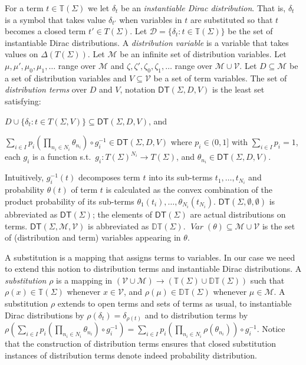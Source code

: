 \documentclass[submission,copyright,creativecommons]{eptcs}
\newcommand{\openT}{\mathbb{T}}
\newcommand{\openTerms}{\openT(\Sigma)}
\newcommand{\closedTerms}{T(\Sigma)}
\newcommand{\openDT}{\mathbb{DT}}
\newcommand{\openDTerms}{\openDT(\Sigma)}
\newcommand{\closedDTerms}{\DT(\Sigma)}
\newcommand{\Var}{\mathop{\textit{Var}}}
\newcommand{\TVar}{\mathcal{V}}
\newcommand{\PVar}{\mathcal{M}}
\newcommand{\DVar}{\mathcal{D}}
\newcommand{\DT}{\textsf{DT}}
\begin{document}
For a term $t\in\openTerms$ we let $\delta_t$ be an
\emph{instantiable Dirac distribution}. That is, $\delta_t$ is a
symbol that takes value $\delta_{t'}$ when variables in $t$
are substituted so that $t$ becomes a closed term $t'\in\closedTerms$.
Let $\DVar = \{\delta_t : t\in \openTerms\}$ be the set of
instantiable Dirac distributions.
A \emph{distribution variable} is a variable that takes values on
$\Delta(\closedTerms)$.  Let $\PVar$ be an infinite set of distribution
variables. Let $\mu, \mu', \mu_0, \mu_1, \ldots$ range over $\PVar$
and $\zeta, \zeta', \zeta_0, \zeta_1, \ldots$ range over $\PVar \cup \TVar$.
Let $D \subseteq \PVar$ be a set of distribution variables and $V\subseteq\TVar$ be a set of term variables.  
The set of \emph{distribution terms} over $D$ and $V$, notation $\DT(\Sigma, D, V)$ is the least set satisfying: 
\begin{inparaenum}[(i)]
\item $D \cup \{\delta_t : t\in T(\Sigma,V)\} \subseteq \DT(\Sigma, D,V)$, and
\item ${\textstyle \sum_{i\in I} p_i (\prod_{n_i \in N_i} \theta_{n_i}) \circ g_i^{-1}} 
  \in \DT(\Sigma, D, V)$ where
    $p_i \in (0,1]$ with $\sum_{i\in I} p_i = 1$,
each $g_i$ is a
function s.t.\ $g_i : \closedTerms^{N_i} \rightarrow \closedTerms$,
  and
$\theta_{n_i}\in \DT(\Sigma, D, V)$.
\end{inparaenum}
Intuitively, $g_i^{-1}(t)$ decomposes term $t$ into its sub-terms $t_1,\ldots,t_{N_i}$ and probability $\theta(t)$ of term $t$ is calculated as the convex combination of the product probability of its sub-terms $\theta_1(t_i),\ldots,\theta_{N_i}(t_{N_i})$.
$\DT(\Sigma, \emptyset, \emptyset)$ is abbreviated as $\closedDTerms$; the elements
of $\closedDTerms$ are actual distributions on terms. $\DT(\Sigma, \PVar, \TVar)$ is
abbreviated as $\openDTerms$.
$\Var(\theta) \subseteq \PVar \cup \TVar$ is the set of  
(distribution and term) variables appearing in $\theta$.


A substitution is a mapping that assigns terms to variables.  In our
case we need to extend this notion to distribution terms and
instantiable Dirac distributions.
A \emph{substitution} $\rho$ is a mapping in $(\TVar\cup
\PVar) \to (\openTerms\cup\openDTerms)$ such that $\rho(x)
\in \openTerms$ whenever $x\in \TVar$, and $\rho(\mu) \in
\openDTerms$ whenever $\mu\in \PVar$.
A substitution $\rho$ extends to open terms and sets of terms as usual,
to instantiable Dirac distributions by $\rho(\delta_t)=\delta_{\rho(t)}$ 
and to distribution terms by 
$\rho({\textstyle \sum_{i\in I} p_i (\prod_{n_i \in N_i} \theta_{n_i}) \circ g_i^{-1}}) = 
 {\textstyle \sum_{i\in I} p_i (\prod_{n_i \in N_i} \rho(\theta_{n_i})) \circ g_i^{-1}}
$. Notice that the construction of distribution terms ensures that closed substitution 
instances of distribution terms denote indeed probability distribution.
\end{document}
